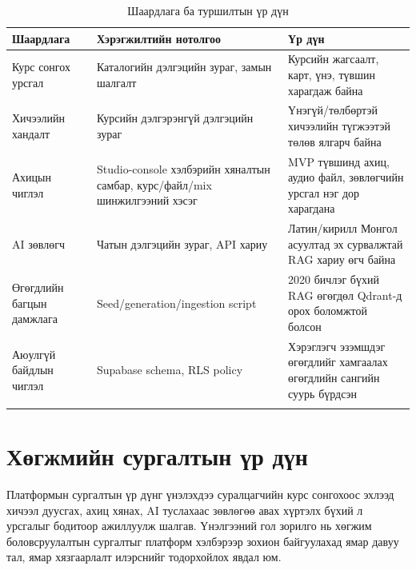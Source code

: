 \begin{longtable}{|p{}|p{}|p{}|}
  \hline
  \textbf{Шаардлага} & \textbf{Хэрэгжилтийн нотолгоо} & \textbf{Үр дүн} \\ \hline
  Курс сонгох урсгал & Каталогийн дэлгэцийн зураг, замын шалгалт & Курсийн жагсаалт, карт, үнэ, түвшин харагдаж байна \\ \hline
  Хичээлийн хандалт & Курсийн дэлгэрэнгүй дэлгэцийн зураг & Үнэгүй/төлбөртэй хичээлийн түгжээтэй төлөв ялгарч байна \\ \hline
  Ахицын чиглэл & Studio-console хэлбэрийн хяналтын самбар, курс/файл/mix шинжилгээний хэсэг & MVP түвшинд ахиц, аудио файл, зөвлөгчийн урсгал нэг дор харагдана \\ \hline
  AI зөвлөгч & Чатын дэлгэцийн зураг, API хариу & Латин/кирилл Монгол асуултад эх сурвалжтай RAG хариу өгч байна \\ \hline
  Өгөгдлийн багцын дамжлага & Seed/generation/ingestion script & 2020 бичлэг бүхий RAG өгөгдөл Qdrant-д орох боломжтой болсон \\ \hline
  Аюулгүй байдлын чиглэл & Supabase schema, RLS policy & Хэрэглэгч эзэмшдэг өгөгдлийг хамгаалах өгөгдлийн сангийн суурь бүрдсэн \\ \hline
  \caption{Шаардлага ба туршилтын үр дүн}
  \label{tab:ch4-requirement-result}
\end{longtable}

\section{Хөгжмийн сургалтын үр дүн}
Платформын сургалтын үр дүнг үнэлэхдээ суралцагчийн курс сонгохоос эхлээд хичээл дуусгах, ахиц хянах, AI туслахаас зөвлөгөө авах хүртэлх бүхий л урсгалыг бодитоор ажиллуулж шалгав. Үнэлгээний гол зорилго нь хөгжим боловсруулалтын сургалтыг платформ хэлбэрээр зохион байгуулахад ямар давуу тал, ямар хязгаарлалт илэрснийг тодорхойлох явдал юм.

